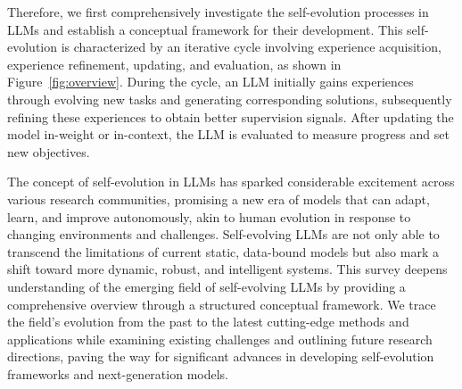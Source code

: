 \documentclass[sn-basic, Numbered]{sn-jnl}%
\theoremstyle{thmstyleone}%
\theoremstyle{thmstyletwo}%
\theoremstyle{thmstylethree}%
\begin{document}
Therefore, we first comprehensively investigate the self-evolution processes in LLMs and establish a conceptual framework for their development. This self-evolution is characterized by an iterative cycle involving experience acquisition, experience refinement, updating, and evaluation, as shown in Figure~\ref{fig:overview}. During the cycle, an LLM initially gains experiences through evolving new tasks and generating corresponding solutions, subsequently refining these experiences to obtain better supervision signals. After updating the model in-weight or in-context, the LLM is evaluated to measure progress and set new objectives.



The concept of self-evolution in LLMs has sparked considerable excitement across various research communities, promising a new era of models that can adapt, learn, and improve autonomously, akin to human evolution in response to changing environments and challenges. Self-evolving LLMs are not only able to transcend the limitations of current static, data-bound models but also mark a shift toward more dynamic, robust, and intelligent systems.
This survey deepens understanding of the emerging field of self-evolving LLMs by providing a comprehensive overview through a structured conceptual framework.
We trace the field's evolution from the past to the latest cutting-edge methods and applications while examining existing challenges and outlining future research directions, paving the way for significant advances in developing self-evolution frameworks and next-generation models.
\end{document}
